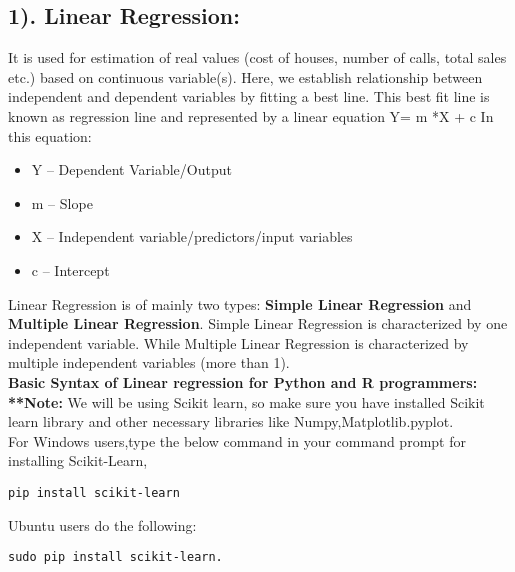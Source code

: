 \documentclass[Proceedings]{ascelike}
\begin{document}
\subsection{1). Linear Regression:}
It is used for estimation of real values (cost of houses, number of calls, total sales etc.) based on continuous variable(s). Here, we establish relationship between independent and dependent variables by fitting a best line. This best fit line is known as regression line and represented by a linear equation Y= m *X + c
In this equation:
\begin{itemize}
	\item Y – Dependent Variable/Output
	\item m – Slope
	\item X – Independent variable/predictors/input variables
	\item c – Intercept
\end{itemize}

Linear Regression is of mainly two types: \textbf{Simple Linear Regression} and \textbf{Multiple Linear Regression}. Simple Linear Regression is characterized by one independent variable. 
While Multiple Linear Regression is characterized by multiple independent variables (more than 1).\\

\textbf{Basic Syntax of Linear regression for Python and R programmers:}\\

\textbf{**Note:} We will be using Scikit learn, so make sure you have installed Scikit learn library and other necessary libraries like Numpy,Matplotlib.pyplot.\\
For Windows users,type the below command in your command prompt for installing Scikit-Learn,
\begin{lstlisting}
pip install scikit-learn
\end{lstlisting}

Ubuntu users do the following: 
\begin{lstlisting}
sudo pip install scikit-learn.
\end{lstlisting}
\end{document}

